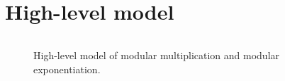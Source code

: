 \section{High-level model}


\begin{figure}[H]
\inputminted[breaklines, fontsize=\footnotesize]{python}{Code/model.py}
\caption{High-level model of modular multiplication and modular exponentiation.}
\label{fig:hl_model}
\end{figure}

